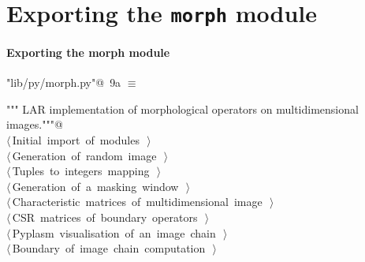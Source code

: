 \documentclass[11pt,oneside]{article}	%
\begin{document}
\section{Exporting the \texttt{morph} module}

\paragraph{Exporting the morph module}
\begin{flushleft} \small
\begin{minipage}{\linewidth} \label{scrap15}
\protect{}\verb@"lib/py/morph.py"@\nobreak\ {\footnotesize 9a }$\equiv$
\vspace{-1ex}
\begin{list}{}{} \item
\mbox{}\verb@""" LAR implementation of morphological operators on multidimensional images."""@\\
\mbox{}\verb@@\hbox{$\langle\,$Initial import of modules\nobreak\ {\footnotesize {}}$\,\rangle$}\verb@@\\
\mbox{}\verb@@\hbox{$\langle\,$Generation of random image\nobreak\ {\footnotesize {}}$\,\rangle$}\verb@@\\
\mbox{}\verb@@\hbox{$\langle\,$Tuples to integers mapping\nobreak\ {\footnotesize {}}$\,\rangle$}\verb@@\\
\mbox{}\verb@@\hbox{$\langle\,$Generation of a masking window\nobreak\ {\footnotesize {}}$\,\rangle$}\verb@@\\
\mbox{}\verb@@\hbox{$\langle\,$Characteristic matrices of multidimensional image\nobreak\ {\footnotesize {}}$\,\rangle$}\verb@@\\
\mbox{}\verb@@\hbox{$\langle\,$CSR matrices of boundary operators\nobreak\ {\footnotesize {}}$\,\rangle$}\verb@@\\
\mbox{}\verb@@\hbox{$\langle\,$Pyplasm visualisation of an image chain\nobreak\ {\footnotesize {}}$\,\rangle$}\verb@@\\
\mbox{}\verb@@\hbox{$\langle\,$Boundary of image chain computation\nobreak\ {\footnotesize {}}$\,\rangle$}\verb@@\\
\mbox{}\verb@@{\NWsep}
\end{list}
\vspace{-2ex}
\end{minipage}\\[4ex]
\end{flushleft}
\end{document}
